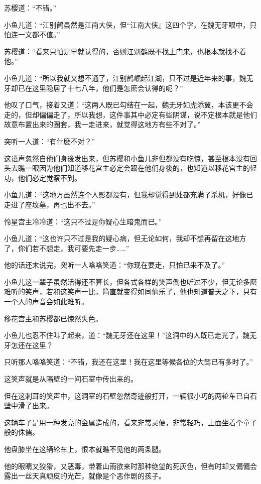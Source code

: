 \documentclass[12pt,oneside]{book}
\begin{document}
苏樱道：``不错。''

小鱼儿道：``江别鹤虽然是江南大侠，但``江南大侠』这四个字，在魏无牙眼中，只怕连一文都不值。''

苏樱道：``看来只怕是早就认得的，否则江别鹤既不找上门来，也根本就找不着他。''

小鱼儿道：``所以我就又想不通了，江别鹤崛起江湖，只不过是近年来的事，魏无牙却已在这里隐居了十七八年，他们是怎麽会认得的呢？''

他叹了口气，接着又道：``这两人既已勾结在一起，魏无牙如虎添翼，本该更不会走的，但却偏偏走了，所以我想，这件事其中必定有些阴谋，说不定根本就是他们故意布置出来的圈套，我一走进来，就觉得这地方有些不对了。''

突听一人道：``有什麽不对？''

这语声忽然自他们身後发出来，但苏樱和小鱼儿非但都没有吃惊，甚至根本没有回头去瞧一眼因为他们知道移花宫主必定会跟在他们身後的，也知道以移花宫主的轻功，他们必定觉察不到。

小鱼儿道：``这地方虽然连个人影都没有，但我却觉得到处都充满了杀机，好像已走进了座坟墓，再也出不去。''

怜星宫主冷冷道：``这只不过是你疑心生暗鬼而已。''

小鱼儿道；``这也许只不过是我的疑心病，但无论如何，我却不想再留在这地方了，你们若不想走，我可要先走一步\ldots\ldots{}''

他的话还末说完，突听一人咯咯笑道：``你现在要走，只怕已来不及了。''

小鱼儿这一辈子虽然活得还不算长，但各式各样的笑声倒也听过不少，但无论多麽难听的笑声，若和这笑声一比，简直就变得如同仙乐了，他也知道普天之下，只有一个人的声音会如此难听。

移花宫主和苏樱都已悚然失色。

小鱼儿也忍不住叫了起来，道：``魏无牙还在这里！''这洞中的人既已走光了，魏无牙怎还在这里？

只听那人咯咯笑道：``不错，我还在这里！我在这里等候各位的大驾已有多时了。''

这笑声就是从隔壁的一间石室中传出来的。

但在这刺耳的笑声中，这洞室的石壁忽然奇迹般打开，一辆很小巧的两轮车已自石壁中滑了出来。

这辆车子是用一种发亮的金属造成的，看来非常灵便，非常轻巧，上面坐着个童子般的侏儒。

他盘膝坐在这辆轮车上，恨本就瞧不见他的两条腿。

他的眼睛又狡猾，又恶毒，带着山雨欲来时那种绝望的死灰色，但有时却又偏偏会露出一丝天真顽皮的光芒，就像是个恶作剧的孩子。
\end{document}
